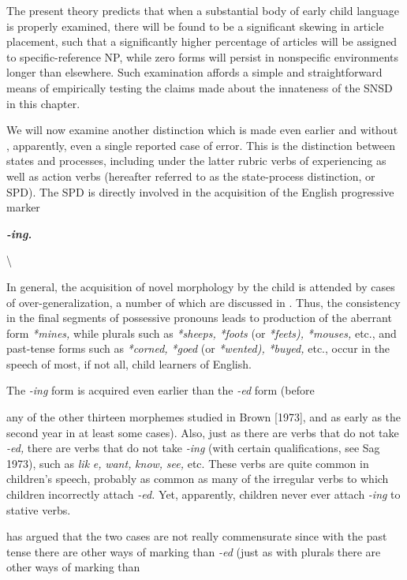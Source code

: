 The present theory predicts that when a substantial body of early child language is properly examined, there will be found to be a significant skewing in article placement, such that a significantly higher percentage of articles will be assigned to specific-reference NP, while zero forms will persist in nonspecific environments longer than elsewhere. Such examination affords a simple and straightforward means of empirically testing the claims made about the innateness of the SNSD in this chapter.

We will now examine another distinction which is made even earlier and without , apparently, even a single reported case of error. This is the distinction between states and processes, including under the latter rubric verbs of experiencing as well as action verbs (hereafter referred to as the state-process distinction, or SPD). The SPD is di\-rectly involved in the acquisition of the English progressive marker

\textbf{\textit{{}-ing.}}

{\textbackslash}


In general, the acquisition of novel morphology by the child is attended by cases of over-generalization, a number of which are dis\-cussed in \citet{Cazden1968}. Thus, the consistency in the final segments of possessive pronouns leads to production of the aberrant form \textit{*mines,} while plurals such as \textit{*sheeps,} \textit{*foots} (or \textit{*feets}\textit{),} \textit{*mouses,} etc., and past-tense forms such as \textit{*corned,} \textit{*goed} (or \textit{*wented}\textit{),} \textit{*buyed, }etc., occur in the speech of most, if not all, child learners of English.

The \textit{{}-i}\textit{n}\textit{g }form is acquired even earlier than the \textit{{}-ed} form (before

any of the other thirteen morphemes studied in Brown [1973], and as early as the second year in at least some cases). Also, just as there are verbs that do not take \textit{{}-ed,} there are verbs that do not take \textit{{}-ing} (with certain qualifications, see Sag 1973), such as \textit{lik} \textit{e,} \textit{want,} \textit{know,} \textit{see,} etc. These verbs are quite common in children's speech, probably as common as many of the irregular verbs to which children incor\-rectly attach \textit{{}-ed.} Yet, apparently, children never ever attach \textit{{}-ing} to stative verbs.

\citet{Kuczaj1978} has argued that the two cases are not really commensurate since with the past tense there are other ways of mark\-ing than \textit{{}-ed }(just as with plurals there are other ways of marking than

